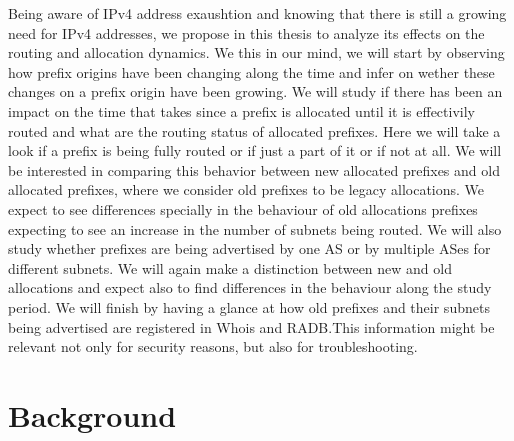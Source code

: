 \documentclass[11pt,a4paper]{scrreprt}
\begin{document}
Being aware of IPv4 address exaushtion and knowing that there is still a growing need for IPv4 addresses, we propose in this thesis to analyze its effects on the routing and allocation dynamics. We this in our mind, we will start by observing how prefix origins have been changing along the time and infer on wether these changes on a prefix origin have been growing. We will study if there has been an impact on the time that takes since a prefix is allocated until it is effectivily routed and what are the routing status of allocated prefixes. Here we will take a look if a prefix is being fully routed or if just a part of it or if not at all. We will be interested in comparing this behavior between new allocated prefixes and old allocated prefixes, where we consider old prefixes to be legacy allocations. We expect to see differences specially in the behaviour of old allocations prefixes expecting to see an increase in the number of subnets being routed. 
We will also study whether prefixes are being advertised by one AS or by multiple ASes for different subnets. We will again make a distinction between new and old allocations and expect also to find differences in the behaviour along the study period. We will finish by having a glance at how old prefixes and their subnets being advertised are registered in Whois and RADB.This information might be relevant not only for security reasons, but also for troubleshooting.   



\chapter{Background}
\end{document}
